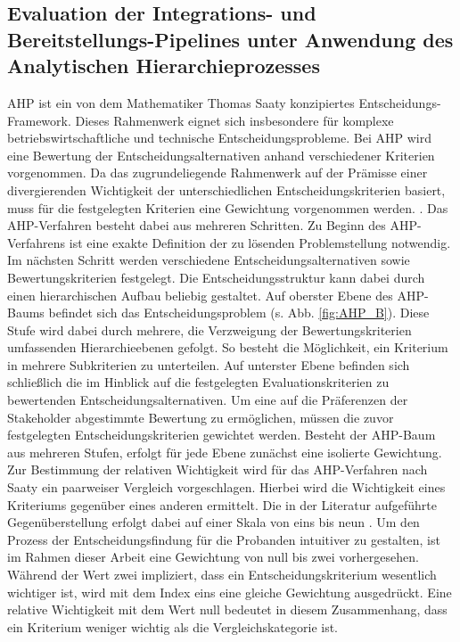 \subsection{Evaluation der Integrations- und Bereitstellungs-Pipelines unter Anwendung des Analytischen Hierarchieprozesses}
AHP ist ein von dem Mathematiker Thomas Saaty konzipiertes Entscheidungs-Framework. Dieses Rahmenwerk eignet sich insbesondere für komplexe betriebswirtschaftliche und technische Entscheidungsprobleme. Bei AHP wird eine Bewertung der Entscheidungsalternativen anhand verschiedener Kriterien vorgenommen.  Da das zugrundeliegende Rahmenwerk auf der Prämisse einer divergierenden Wichtigkeit der unterschiedlichen Entscheidungskriterien basiert, muss für die festgelegten Kriterien eine Gewichtung vorgenommen werden. \cite[86]{Saaty.2008}. Das AHP-Verfahren besteht dabei aus mehreren Schritten. Zu Beginn des AHP-Verfahrens ist eine exakte Definition der zu lösenden Problemstellung notwendig. Im nächsten Schritt werden verschiedene Entscheidungsalternativen sowie Bewertungskriterien festgelegt. Die Entscheidungsstruktur kann dabei durch einen hierarchischen Aufbau beliebig gestaltet. Auf oberster Ebene des AHP-Baums befindet sich das Entscheidungsproblem (s. Abb. \ref*{fig:AHP_B}). Diese Stufe wird dabei durch mehrere, die Verzweigung der Bewertungskriterien umfassenden Hierarchieebenen gefolgt. So besteht die Möglichkeit, ein Kriterium in mehrere Subkriterien zu unterteilen. Auf unterster Ebene befinden sich schließlich die im Hinblick auf die festgelegten Evaluationskriterien zu bewertenden Entscheidungsalternativen. Um eine auf die Präferenzen der Stakeholder abgestimmte Bewertung zu ermöglichen, müssen die zuvor festgelegten Entscheidungskriterien gewichtet werden. Besteht der AHP-Baum aus mehreren Stufen, erfolgt für jede Ebene zunächst eine isolierte Gewichtung. Zur Bestimmung der relativen Wichtigkeit wird für das AHP-Verfahren nach Saaty ein paarweiser Vergleich vorgeschlagen. Hierbei wird die Wichtigkeit eines Kriteriums gegenüber eines anderen ermittelt. Die in der Literatur aufgeführte Gegenüberstellung erfolgt dabei auf einer Skala von eins bis neun \cite[86]{Saaty.2008}. Um den Prozess der Entscheidungsfindung für die Probanden intuitiver zu gestalten, ist im Rahmen dieser Arbeit eine Gewichtung von null bis zwei vorhergesehen. Während der Wert zwei impliziert, dass ein Entscheidungskriterium wesentlich wichtiger ist, wird mit dem Index eins eine gleiche Gewichtung ausgedrückt. Eine relative Wichtigkeit mit dem Wert null bedeutet in diesem Zusammenhang, dass ein Kriterium weniger wichtig als die Vergleichskategorie ist.  
